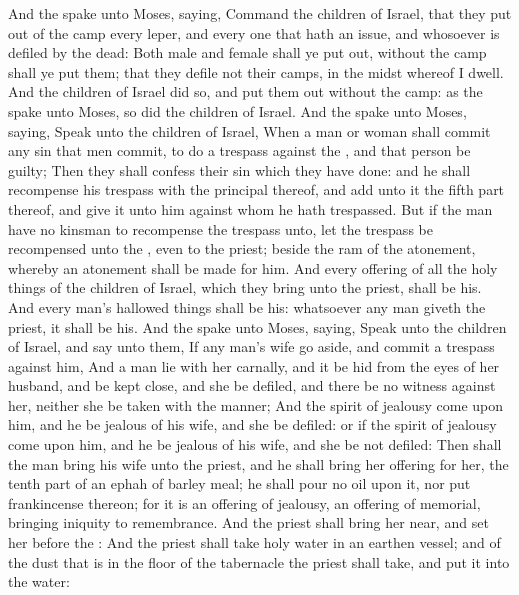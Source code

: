 \begin{biblechapter} %
 And the \LORD spake unto Moses, saying,
\verse Command the children of Israel, that they put out of the camp every leper, and every one that hath an issue, and whosoever is defiled by the dead:
\verse Both male and female shall ye put out, without the camp shall ye put them; that they defile not their camps, in the midst whereof I dwell.
\verse And the children of Israel did so, and put them out without the camp: as the \LORD spake unto Moses, so did the children of Israel.
 And the \LORD spake unto Moses, saying,
\verse Speak unto the children of Israel, When a man or woman shall commit any sin that men commit, to do a trespass against the \LORD, and that person be guilty;
\verse Then they shall confess their sin which they have done: and he shall recompense his trespass with the principal thereof, and add unto it the fifth part thereof, and give it unto him against whom he hath trespassed.
\verse But if the man have no kinsman to recompense the trespass unto, let the trespass be recompensed unto the \LORD, even to the priest; beside the ram of the atonement, whereby an atonement shall be made for him.
\verse And every offering of all the holy things of the children of Israel, which they bring unto the priest, shall be his.
\verse And every man's hallowed things shall be his: whatsoever any man giveth the priest, it shall be his.
 And the \LORD spake unto Moses, saying,
\verse Speak unto the children of Israel, and say unto them, If any man's wife go aside, and commit a trespass against him,
\verse And a man lie with her carnally, and it be hid from the eyes of her husband, and be kept close, and she be defiled, and there be no witness against her, neither she be taken with the manner;
\verse And the spirit of jealousy come upon him, and he be jealous of his wife, and she be defiled: or if the spirit of jealousy come upon him, and he be jealous of his wife, and she be not defiled:
\verse Then shall the man bring his wife unto the priest, and he shall bring her offering for her, the tenth part of an ephah of barley meal; he shall pour no oil upon it, nor put frankincense thereon; for it is an offering of jealousy, an offering of memorial, bringing iniquity to remembrance.
\verse And the priest shall bring her near, and set her before the \LORD:
\verse And the priest shall take holy water in an earthen vessel; and of the dust that is in the floor of the tabernacle the priest shall take, and put it into the water:

\end{biblechapter}
